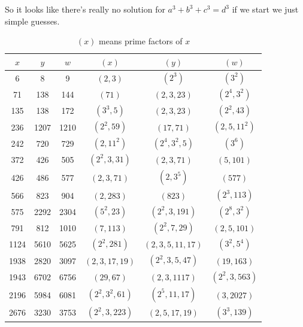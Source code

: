 \documentclass[aps,preprint,preprintnumbers,nofootinbib,showpacs,prd]{revtex4-1}
\begin{document}
\begin{enumerate}
So it looks like there's really no solution for $a^3 + b^3 + c^3 = d^3$ if we start we just simple guesses. 



\end{enumerate}


















%
\begin{table}[]
\centering
\caption{$(x)$ means prime factors of $x$}
\label{Tab:1}
\begin{tabular}{|c|c|c|c|c|c|}
\hline
$x$ & $y$ & $w$ & $(x)$ & $(y)$ & $(w)$ \\ \hline 
6 & 8 & 9 & $(2, 3)$ & $(2^3)$ & $(3^2)$ \\
71 & 138 & 144  & $(71)$ & $(2,3,23)$ & $(2^4, 3^2)$ \\
135 & 138 & 172  & $(3^3, 5)$ & $(2,3,23)$ & $(2^2, 43)$ \\
236 & 1207 & 1210  & $(2^2,59)$ & $(17,71)$ & $(2,5,11^2)$ \\
242 & 720 & 729  & $(2, 11^2)$ & $(2^4, 3^2, 5)$ & $(3^6)$ \\
372 & 426 & 505  & $(2^2,3,31)$ & $(2,3,71)$ & $(5,101)$ \\
426 & 486 & 577  & $(2,3,71)$ & $(2,3^5)$ & $(577)$ \\
566 & 823 & 904  & $(2,283)$ & $(823)$ & $(2^3,113)$ \\
575 & 2292 & 2304  & $(5^2,23)$ & $(2^2,3,191)$ & $(2^8,3^2)$ \\
791 & 812 & 1010  & $(7,113)$ & $(2^2,7,29)$ & $(2,5,101)$ \\
1124 & 5610 & 5625  & $(2^2,281)$ & $(2,3,5,11,17)$ & $(3^2,5^4)$ \\
1938 & 2820 & 3097  & $(2,3,17,19)$ & $(2^2,3,5,47)$ & $(19,163)$ \\
1943 & 6702 & 6756  & $(29,67)$ & $(2,3,1117)$ & $(2^2,3,563)$ \\
2196 & 5984 & 6081  & $(2^2,3^2,61)$ & $(2^5,11,17)$ & $(3,2027)$ \\
2676 & 3230 & 3753  & $(2^2,3,223)$ & $(2,5,17,19)$ & $(3^3,139)$ \\ \hline
\end{tabular}
\end{table}
%
\end{document}
